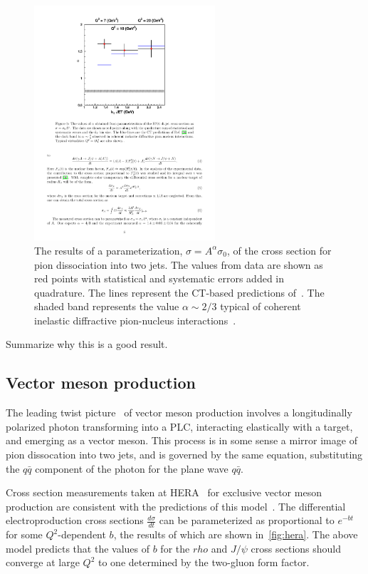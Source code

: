 \begin{figure}[!h]
    \centering
    \includegraphics[width=0.6\textwidth]{chap2/pion_dijet_alpha.pdf}
    \caption{The results of a parameterization, $\sigma=A^\alpha\sigma_0$, of
             the cross section for pion dissociation into two jets.
             The values from data are shown as red points with statistical and
             systematic errors added in quadrature.
             The lines represent the CT-based predictions
             of~\cite{Frankfurt_1993}.
             The shaded band represents the value $\alpha\sim2/3$ typical of
             coherent inelastic diffractive pion-nucleus
             interactions~\cite{Zielinsk_1983}.
            }
    \label{fig:pion_dijet_alpha}
\end{figure}


Summarize why this is a good result.

\subsection{Vector meson production}
The leading twist picture~\cite{Brodsky_1994} of vector meson production
involves a longitudinally polarized photon transforming into a PLC, interacting
elastically with a target, and emerging as a vector meson.
This process is in some sense a mirror image of pion dissocation into two jets,
and is governed by the same equation, substituting the $q\bar{q}$ component of
the photon for the plane wave $q\bar{q}$.


Cross section measurements taken at HERA~\cite{Chekanov_2004, Chekanov_2007}
for exclusive vector meson production are consistent with the predictions of
this model~\cite{Frankfurt_2005}.
The differential electroproduction cross sections $\frac{d\sigma}{dt}$ can be
parameterized as proportional to $e^{-bt}$ for some $Q^2$-dependent $b$, the
results of which are shown in~\ref{fig:hera}.
The above model predicts that the values of $b$ for the $rho$ and $J/\psi$
cross sections should converge at large $Q^2$ to one determined by the
two-gluon form factor.

